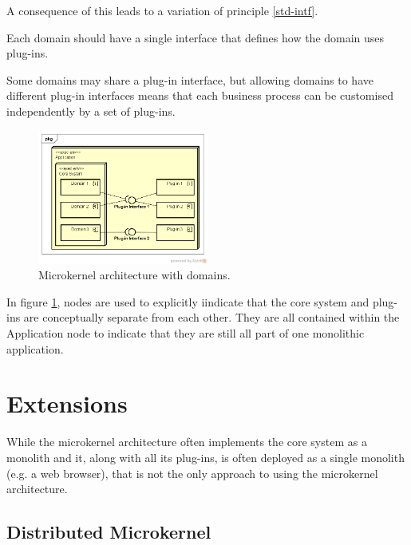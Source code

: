 A consequence of this leads to a variation of principle \ref{std-intf}.

\vspace{1mm}
\begin{definition}\label{domain-intf}
    Each domain should have a single interface that defines how the domain uses plug-ins.
\end{definition}

Some domains may share a plug-in interface, but allowing domains to have different plug-in interfaces
means that each business process can be customised independently by a set of plug-ins.

\begin{figure}[h!]
    \centering
    \includegraphics[trim=38 42 23 42,clip,width=0.5\textwidth]{diagrams/domain-microkernel.png}
    \caption{Microkernel architecture with domains.}
    \label{fig:microkernel-domains}
\end{figure}

In figure \ref{fig:microkernel-domains}, nodes are used to explicitly iindicate that the core system and plug-ins are conceptually separate from each other.
They are all contained within the Application node to indicate that they are still all part of one monolithic application.

\section{Extensions}

While the microkernel architecture often implements the core system as a monolith
and it, along with all its plug-ins, is often deployed as a single monolith
(e.g. a web browser), that is not the only approach to using the microkernel architecture.

\subsection{Distributed Microkernel}

